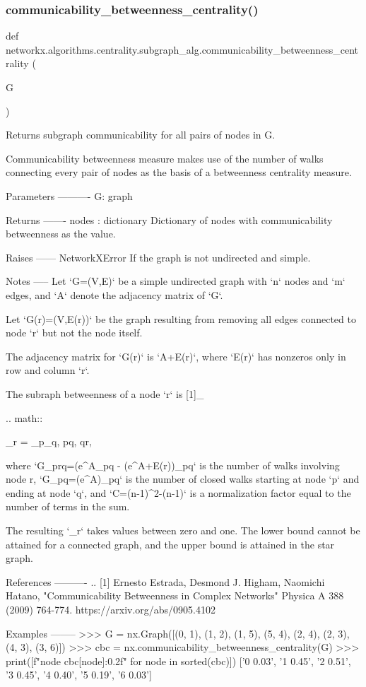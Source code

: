 \subsubsection{\texorpdfstring{communicability\+\_\+betweenness\+\_\+centrality()}{communicability\_betweenness\_centrality()}}
{\footnotesize\ttfamily def networkx.\+algorithms.\+centrality.\+subgraph\+\_\+alg.\+communicability\+\_\+betweenness\+\_\+centrality (\begin{DoxyParamCaption}\item[{}]{G }\end{DoxyParamCaption})}

\begin{DoxyVerb}Returns subgraph communicability for all pairs of nodes in G.

Communicability betweenness measure makes use of the number of walks
connecting every pair of nodes as the basis of a betweenness centrality
measure.

Parameters
----------
G: graph

Returns
-------
nodes : dictionary
    Dictionary of nodes with communicability betweenness as the value.

Raises
------
NetworkXError
    If the graph is not undirected and simple.

Notes
-----
Let `G=(V,E)` be a simple undirected graph with `n` nodes and `m` edges,
and `A` denote the adjacency matrix of `G`.

Let `G(r)=(V,E(r))` be the graph resulting from
removing all edges connected to node `r` but not the node itself.

The adjacency matrix for `G(r)` is `A+E(r)`,  where `E(r)` has nonzeros
only in row and column `r`.

The subraph betweenness of a node `r`  is [1]_

.. math::

     \omega_{r} = \sum_{p}\sum_{q},
     p\neq q, q\neq r,

where
`G_{prq}=(e^{A}_{pq} - (e^{A+E(r)})_{pq}`  is the number of walks
involving node r,
`G_{pq}=(e^{A})_{pq}` is the number of closed walks starting
at node `p` and ending at node `q`,
and `C=(n-1)^{2}-(n-1)` is a normalization factor equal to the
number of terms in the sum.

The resulting `\omega_{r}` takes values between zero and one.
The lower bound cannot be attained for a connected
graph, and the upper bound is attained in the star graph.

References
----------
.. [1] Ernesto Estrada, Desmond J. Higham, Naomichi Hatano,
   "Communicability Betweenness in Complex Networks"
   Physica A 388 (2009) 764-774.
   https://arxiv.org/abs/0905.4102

Examples
--------
>>> G = nx.Graph([(0, 1), (1, 2), (1, 5), (5, 4), (2, 4), (2, 3), (4, 3), (3, 6)])
>>> cbc = nx.communicability_betweenness_centrality(G)
>>> print([f"{node} {cbc[node]:0.2f}" for node in sorted(cbc)])
['0 0.03', '1 0.45', '2 0.51', '3 0.45', '4 0.40', '5 0.19', '6 0.03']
\end{DoxyVerb}
